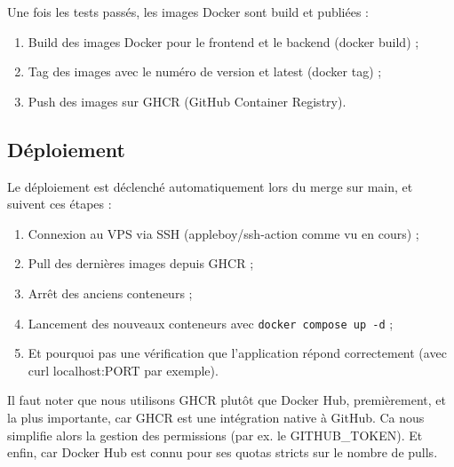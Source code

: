 \documentclass{article}
\begin{document}
Une fois les tests passés, les images Docker sont build et publiées :

\begin{enumerate}
    \item Build des images Docker pour le frontend et le backend (docker build) ;
    \item Tag des images avec le numéro de version et latest (docker tag) ;
    \item Push des images sur GHCR (GitHub Container Registry).
\end{enumerate}

\subsection{Déploiement}

Le déploiement est déclenché automatiquement lors du merge sur main, et suivent ces étapes : 

\begin{enumerate}
    \item Connexion au VPS via SSH (appleboy/ssh-action comme vu en cours) ;
    \item Pull des dernières images depuis GHCR ;
    \item Arrêt des anciens conteneurs ;
    \item Lancement des nouveaux conteneurs avec \texttt{docker compose up -d} ;
    \item Et pourquoi pas une vérification que l'application répond correctement (avec curl localhost:PORT par exemple).
\end{enumerate}

Il faut noter que nous utilisons GHCR plutôt que Docker Hub, premièrement, et la plus importante, car GHCR est une intégration native à GitHub. Ca nous simplifie alors la gestion des permissions (par ex. le GITHUB\_TOKEN). Et enfin, car Docker Hub est connu pour ses quotas stricts sur le nombre de pulls.
\end{document}
